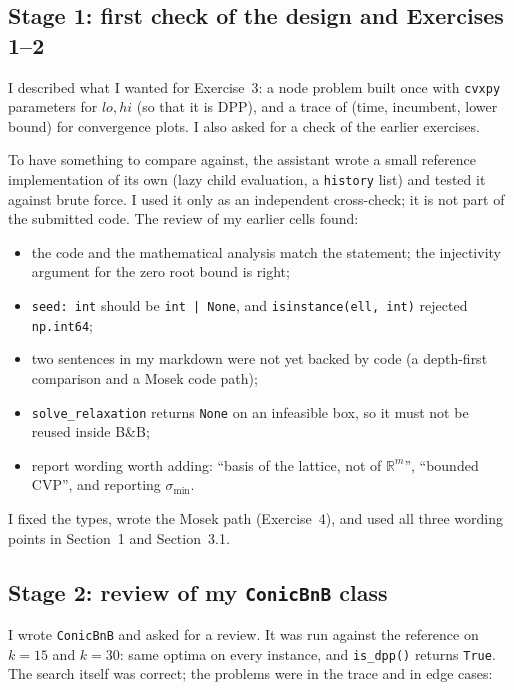 \documentclass[11pt,a4paper]{article}
\newcommand{\R}{\mathbb{R}}
\newcommand{\BB}{B\&B}
\begin{document}
\subsection{Stage 1: first check of the design and Exercises 1--2}

I described what I wanted for Exercise~3: a node problem built once with \texttt{cvxpy} parameters for $lo,hi$ (so that it is DPP), and a trace of (time, incumbent, lower bound) for convergence plots. I also asked for a check of the earlier exercises.

To have something to compare against, the assistant wrote a small reference implementation of its own (lazy child evaluation, a \texttt{history} list) and tested it against brute force. I used it only as an independent cross-check; it is not part of the submitted code. The review of my earlier cells found:
\begin{itemize}
  \item the code and the mathematical analysis match the statement; the injectivity argument for the zero root bound is right;
  \item \texttt{seed: int} should be \texttt{int | None}, and \texttt{isinstance(ell, int)} rejected \texttt{np.int64};
  \item two sentences in my markdown were not yet backed by code (a depth-first comparison and a Mosek code path);
  \item \texttt{solve\_relaxation} returns \texttt{None} on an infeasible box, so it must not be reused inside \BB{};
  \item report wording worth adding: ``basis of the lattice, not of $\R^m$'', ``bounded CVP'', and reporting $\sigma_{\min}$.
\end{itemize}
I fixed the types, wrote the Mosek path (Exercise~4), and used all three wording points in Section~1 and Section~3.1.

\subsection{Stage 2: review of my \texttt{ConicBnB} class}

I wrote \texttt{ConicBnB} and asked for a review. It was run against the reference on $k=15$ and $k=30$: same optima on every instance, and \texttt{is\_dpp()} returns \texttt{True}. The search itself was correct; the problems were in the trace and in edge cases:
\end{document}
